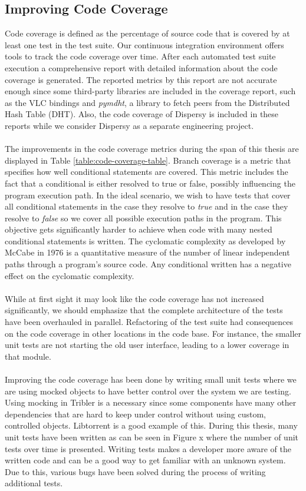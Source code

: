 \subsection{Improving Code Coverage}
Code coverage is defined as the percentage of source code that is covered by at least one test in the test suite. Our continuous integration environment offers tools to track the code coverage over time. After each automated test suite execution a comprehensive report with detailed information about the code coverage is generated. The reported metrics by this report are not accurate enough since some third-party libraries are included in the coverage report, such as the VLC bindings and \emph{pymdht}, a library to fetch peers from the Distributed Hash Table (DHT). Also, the code coverage of Dispersy is included in these reports while we consider Dispersy as a separate engineering project.\\\\
The improvements in the code coverage metrics during the span of this thesis are displayed in Table \ref{table:code-coverage-table}. Branch coverage is a metric that specifies how well conditional statements are covered. This metric includes the fact that a conditional is either resolved to true or false, possibly influencing the program execution path. In the ideal scenario, we wish to have tests that cover all conditional statements in the case they resolve to \emph{true} and in the case they resolve to \emph{false} so we cover all possible execution paths in the program. This objective gets significantly harder to achieve when code with many nested conditional statements is written. The cyclomatic complexity as developed by McCabe in 1976\cite{mccabe1976complexity} is a quantitative measure of the number of linear independent paths through a program's source code. Any conditional written has a negative effect on the cyclomatic complexity.\\\\
While at first sight it may look like the code coverage has not increased significantly, we should emphasize that the complete architecture of the tests have been overhauled in parallel. Refactoring of the test suite had consequences on the code coverage in other locations in the code base. For instance, the smaller unit tests are not starting the old user interface, leading to a lower coverage in that module.\\\\
Improving the code coverage has been done by writing small unit tests where we are using mocked objects to have better control over the system we are testing. Using mocking in Tribler is a necessary since some components have many other dependencies that are hard to keep under control without using custom, controlled objects. Libtorrent is a good example of this. During this thesis, many unit tests have been written as can be seen in Figure x where the number of unit tests over time is presented. Writing tests makes a developer more aware of the written code and can be a good way to get familiar with an unknown system. Due to this, various bugs have been solved during the process of writing additional tests.

